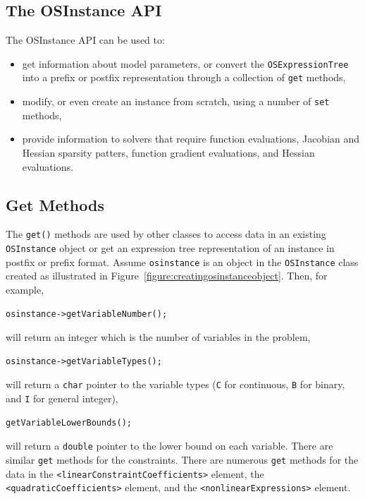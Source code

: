 \documentclass[11pt]{article}
\newcounter{Fig}
\renewcommand{\_}{{\char"5F}}
\renewcommand{\{}{{\char"7B}}
\renewcommand{\}}{{\char"7D}}
\renewcommand{\^}{{\char"0D}}
\renewcommand{\'}{{\char"0D}}
\begin{document}
\begin{enumerate}[Step 1:]
\section{The  OSInstance API}\label{section:osinstanceAPI}

The OSInstance API can be used to:

\begin{itemize}

\item  get information about model parameters, or convert the {\tt OSExpressionTree} into a prefix or postfix
representation through a collection  of {\tt get} methods,

\item modify, or even create an instance from scratch, using a number of {\tt set} methods,

\item provide information to solvers that require function evaluations, Jacobian and Hessian sparsity patters,  function gradient evaluations, and Hessian evaluations.

\end{itemize}



\subsection{Get Methods}

The {\tt get()} methods are used by other classes to access data in an existing {\tt OSInstance} object or get an expression tree representation of an instance in postfix or prefix format.   Assume {\tt osinstance} is an object in the {\tt OSInstance} class created as illustrated in Figure~\ref{figure:creatingosinstanceobject}. Then, for example,
\begin{verbatim}
osinstance->getVariableNumber();
\end{verbatim}
will return an integer which is the number of variables in the problem,
\begin{verbatim}
osinstance->getVariableTypes();
\end{verbatim}
will return a {\tt char} pointer to the variable types ({\tt C} for continuous, {\tt B} for binary, and {\tt I} for general integer),
\begin{verbatim}
getVariableLowerBounds();
\end{verbatim}
will  return a {\tt double} pointer to the lower bound on each variable. There are similar {\tt get} methods for the constraints. There are numerous {\tt get} methods for the data in the {\tt <linearConstraintCoefficients>}  element, the {\tt <quadraticCoefficients>} element, and the {\tt <nonlinearExpressions>} element.


\end{enumerate}
\end{document}

